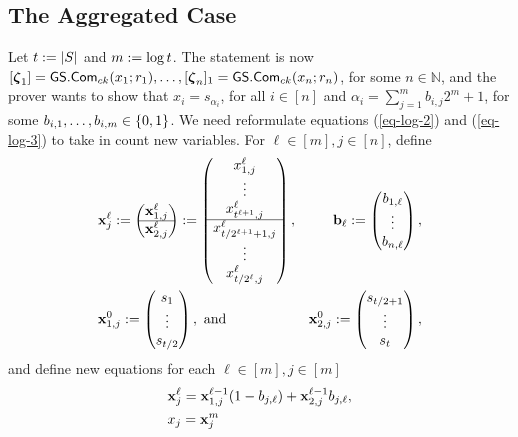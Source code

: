 \subsection{The Aggregated Case} \label{sec:log-set-memb-Z}
Let $t:=|S|$ and \(m:=\log t \). The statement is now \([{\boldsymbol \zeta}_1]={\mathsf{GS}}.\mathsf{Com}_{ck}(x_1;r_1),\ldots,\allowbreak[{\boldsymbol \zeta}_n]_1={\mathsf{GS}}.\mathsf{Com}_{ck}(x_n;r_n)\), for some $n\in\mathbb{N}$, and the prover wants to show that \(x_i=s_{\alpha_i}\), for all \(i\in[n]\) and \(\alpha_i=\sum_{j=1}^m b_{i,j}2^m+1\), for some $b_{i,1},\ldots,b_{i,m}\in\{0,1\}$. We need reformulate equations (\ref{eq-log-2}) and (\ref{eq-log-3}) to take in count new variables. For \(\ell\in [m],j\in[n]\), define
\begin{align*}
&\mathbf{x}_j^\ell:=
\begin{pmatrix}
\mathbf{x}^\ell_{1,j}\\
\hline
\mathbf{x}^\ell_{2,j}
\end{pmatrix}
:=
\begin{pmatrix}
x^\ell_{1,j}\\\vdots\\x^\ell_{t ^{\ell+1},j}\\
\hline
x^\ell_{t /2^{\ell+1}+1,j}\\\vdots\\x^\ell_{t /2^\ell,j}
\end{pmatrix},
&\mathbf{b}_\ell := 
\begin{pmatrix}
b_{1,\ell}\\\vdots\\b_{n,\ell}
\end{pmatrix},\\
&\mathbf{x}_{1,j}^0 := \begin{pmatrix}
s_1\\\vdots\\s_{t /2}
\end{pmatrix},\text{ and }
&\mathbf{x}_{2,j}^0 := \begin{pmatrix}
s_{t /2+1}\\\vdots\\s_{t }
\end{pmatrix},
\end{align*}
and define new equations for each $\ell\in[m],j\in[m]$
\begin{align}
&\mathbf{x}^\ell_j=\mathbf{x}^{\ell-1}_{1,j}({1}-{b}_{j,\ell})+\mathbf{x}^{\ell-1}_{2,j}{b}_{j,\ell},\label{eq-alog-1}\\
&x_j= \mathbf{x}_{j}^m\label{eq-alog-1}
\end{align}

